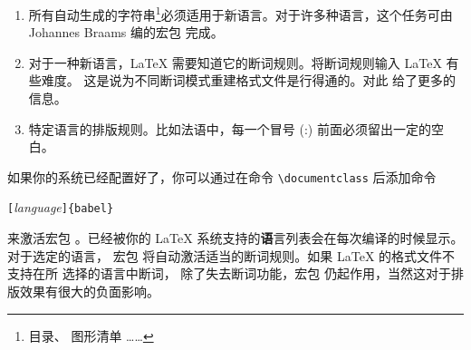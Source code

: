 \begin{enumerate}
\item  所有自动生成的字符串\footnote{目录、 图形清单
……}必须适用于新语言。对于许多种语言，这个任务可由 Johannes
  Braams 编的宏包  完成。
\item 对于一种新语言，\LaTeX{} 需要知道它的断词规则。将断词规则输入 \LaTeX{} 有些难度。
这是说为不同断词模式重建格式文件是行得通的。对此 \guide{} 给了更多的信息。
\item
特定语言的排版规则。比如法语中，每一个冒号 (:) 前面必须留出一定的空白。
\end{enumerate}


如果你的系统已经配置好了，你可以通过在命令 \verb|\documentclass| 后添加命令
\begin{lscommand}
\verb|[|\emph{language}\verb|]{babel}|
\end{lscommand}
\noindent
来激活宏包 。已经被你的 \LaTeX{} 系统支持的{\textbf
语言}列表会在每次编译的时候显示。对于选定的语言，
宏包  将自动激活适当的断词规则。如果 \LaTeX{} 的格式文件不支持在所
选择的语言中断词，
除了失去断词功能，宏包  仍起作用，当然这对于排版效果有很大的负面影响。

